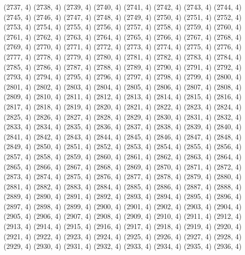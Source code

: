 {   (2737, 4)
   (2738, 4)
   (2739, 4)
   (2740, 4)
   (2741, 4)
   (2742, 4)
   (2743, 4)
   (2744, 4)
   (2745, 4)
   (2746, 4)
   (2747, 4)
   (2748, 4)
   (2749, 4)
   (2750, 4)
   (2751, 4)
   (2752, 4)
   (2753, 4)
   (2754, 4)
   (2755, 4)
   (2756, 4)
   (2757, 4)
   (2758, 4)
   (2759, 4)
   (2760, 4)
   (2761, 4)
   (2762, 4)
   (2763, 4)
   (2764, 4)
   (2765, 4)
   (2766, 4)
   (2767, 4)
   (2768, 4)
   (2769, 4)
   (2770, 4)
   (2771, 4)
   (2772, 4)
   (2773, 4)
   (2774, 4)
   (2775, 4)
   (2776, 4)
   (2777, 4)
   (2778, 4)
   (2779, 4)
   (2780, 4)
   (2781, 4)
   (2782, 4)
   (2783, 4)
   (2784, 4)
   (2785, 4)
   (2786, 4)
   (2787, 4)
   (2788, 4)
   (2789, 4)
   (2790, 4)
   (2791, 4)
   (2792, 4)
   (2793, 4)
   (2794, 4)
   (2795, 4)
   (2796, 4)
   (2797, 4)
   (2798, 4)
   (2799, 4)
   (2800, 4)
   (2801, 4)
   (2802, 4)
   (2803, 4)
   (2804, 4)
   (2805, 4)
   (2806, 4)
   (2807, 4)
   (2808, 4)
   (2809, 4)
   (2810, 4)
   (2811, 4)
   (2812, 4)
   (2813, 4)
   (2814, 4)
   (2815, 4)
   (2816, 4)
   (2817, 4)
   (2818, 4)
   (2819, 4)
   (2820, 4)
   (2821, 4)
   (2822, 4)
   (2823, 4)
   (2824, 4)
   (2825, 4)
   (2826, 4)
   (2827, 4)
   (2828, 4)
   (2829, 4)
   (2830, 4)
   (2831, 4)
   (2832, 4)
   (2833, 4)
   (2834, 4)
   (2835, 4)
   (2836, 4)
   (2837, 4)
   (2838, 4)
   (2839, 4)
   (2840, 4)
   (2841, 4)
   (2842, 4)
   (2843, 4)
   (2844, 4)
   (2845, 4)
   (2846, 4)
   (2847, 4)
   (2848, 4)
   (2849, 4)
   (2850, 4)
   (2851, 4)
   (2852, 4)
   (2853, 4)
   (2854, 4)
   (2855, 4)
   (2856, 4)
   (2857, 4)
   (2858, 4)
   (2859, 4)
   (2860, 4)
   (2861, 4)
   (2862, 4)
   (2863, 4)
   (2864, 4)
   (2865, 4)
   (2866, 4)
   (2867, 4)
   (2868, 4)
   (2869, 4)
   (2870, 4)
   (2871, 4)
   (2872, 4)
   (2873, 4)
   (2874, 4)
   (2875, 4)
   (2876, 4)
   (2877, 4)
   (2878, 4)
   (2879, 4)
   (2880, 4)
   (2881, 4)
   (2882, 4)
   (2883, 4)
   (2884, 4)
   (2885, 4)
   (2886, 4)
   (2887, 4)
   (2888, 4)
   (2889, 4)
   (2890, 4)
   (2891, 4)
   (2892, 4)
   (2893, 4)
   (2894, 4)
   (2895, 4)
   (2896, 4)
   (2897, 4)
   (2898, 4)
   (2899, 4)
   (2900, 4)
   (2901, 4)
   (2902, 4)
   (2903, 4)
   (2904, 4)
   (2905, 4)
   (2906, 4)
   (2907, 4)
   (2908, 4)
   (2909, 4)
   (2910, 4)
   (2911, 4)
   (2912, 4)
   (2913, 4)
   (2914, 4)
   (2915, 4)
   (2916, 4)
   (2917, 4)
   (2918, 4)
   (2919, 4)
   (2920, 4)
   (2921, 4)
   (2922, 4)
   (2923, 4)
   (2924, 4)
   (2925, 4)
   (2926, 4)
   (2927, 4)
   (2928, 4)
   (2929, 4)
   (2930, 4)
   (2931, 4)
   (2932, 4)
   (2933, 4)
   (2934, 4)
   (2935, 4)
   (2936, 4)
}
